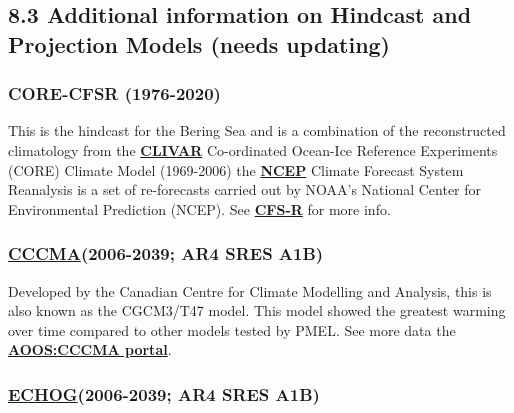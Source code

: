 \documentclass[
]{article}
\begin{document}
\hypertarget{additional-information-on-hindcast-and-projection-models-needs-updating}{%
\subsection{8.3 Additional information on Hindcast and Projection Models
(needs
updating)}\label{additional-information-on-hindcast-and-projection-models-needs-updating}}

\hypertarget{core-cfsr-1976-2020}{%
\subsubsection{CORE-CFSR (1976-2020)}\label{core-cfsr-1976-2020}}

This is the hindcast for the Bering Sea and is a combination of the
reconstructed climatology from the
\href{http://portal.aoos.org/bering-sea.php\#module-metadata/5626a0b6-7d79-11e3-ac17-00219bfe5678/0756e6c2-a8e2-40af-aa3d-22051ed68067}{\textbf{CLIVAR}}
Co-ordinated Ocean-Ice Reference Experiments (CORE) Climate Model
(1969-2006) the
\href{http://portal.aoos.org/bering-sea.php\#module-metadata/f8cb79f6-7d59-11e3-a6ee-00219bfe5678/2deb2eca-f3f5-4eda-a132-112468711de7}{\textbf{NCEP}}
Climate Forecast System Reanalysis is a set of re-forecasts carried out
by NOAA's National Center for Environmental Prediction (NCEP). See
\href{http://cfs.ncep.noaa.gov/cfsr/}{\textbf{CFS-R}} for more info.

\hypertarget{cccma2006-2039-ar4-sres-a1b}{%
\subsubsection{\texorpdfstring{\href{http://www.cccma.ec.gc.ca/diagnostics/cgcm3/cgcm3.shtml}{CCCMA}(2006-2039;
AR4 SRES
A1B)}{CCCMA(2006-2039; AR4 SRES A1B)}}\label{cccma2006-2039-ar4-sres-a1b}}

Developed by the Canadian Centre for Climate Modelling and Analysis,
this is also known as the CGCM3/T47 model. This model showed the
greatest warming over time compared to other models tested by PMEL. See
more data the
\href{http://portal.aoos.org/bering-sea.php\#module-metadata/4f706756-7d57-11e3-bce5-00219bfe5678/ffa1bcc1-288d-4f8e-912e-500a618b241a}{\textbf{AOOS:CCCMA
portal}}.

\hypertarget{echog2006-2039-ar4-sres-a1b}{%
\subsubsection{\texorpdfstring{\href{http://www-pcmdi.llnl.gov/ipcc/model_documentation/ECHO-G.pdf}{ECHOG}(2006-2039;
AR4 SRES
A1B)}{ECHOG(2006-2039; AR4 SRES A1B)}}\label{echog2006-2039-ar4-sres-a1b}}
\end{document}
